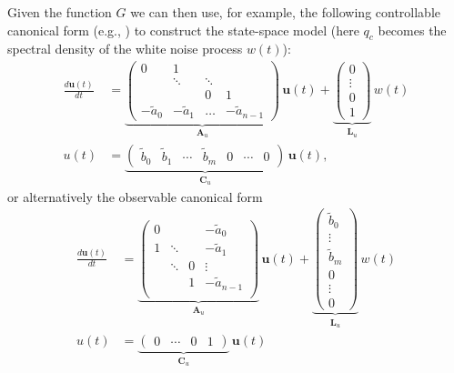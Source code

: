 \documentclass[journal]{IEEEtran}
\begin{document}
Given the function $G$ we can then use, for example, the following controllable canonical form (e.g., \cite{Glad+Ljung:2000}) to construct the state-space model (here $q_c$ becomes the spectral density of the white noise process $w(t)$):
%
\begin{equation}
\begin{split}
  \frac{d\mathbf{u}(t)}{dt}
  &= \underbrace{\begin{pmatrix}
       0             & 1      &        &       \\
                     & \ddots & \ddots &       \\
                     &         &  0    &     1 \\
   -\tilde{a}_0 & -\tilde{a}_1 & \hdots &  -\tilde{a}_{n-1}
  \end{pmatrix}}_{\mathbf{A}_u} \, \mathbf{u}(t) 
  + \underbrace{\begin{pmatrix}
      0 \\
      \vdots \\
      0 \\
      1
  \end{pmatrix}}_{\mathbf{L}_u} \,
   w(t) \\
   u(t) &=
   \underbrace{\begin{pmatrix} \tilde{b}_0 & \tilde{b}_1 & \cdots & \tilde{b}_m & 0 & \cdots & 0
   \end{pmatrix}}_{\mathbf{C}_u} \, \mathbf{u}(t),
\end{split}
\end{equation}
%
or alternatively the observable canonical form
%
\begin{equation}
\begin{split}
  \frac{d\mathbf{u}(t)}{dt}
  &= \underbrace{\begin{pmatrix}
       0             &        &        & -\tilde{a}_0 \\
       1             & \ddots &        & -\tilde{a}_1 \\
                     & \ddots &  0     & \vdots   \\
                     &        &  1     & -\tilde{a}_{n-1} \\
  \end{pmatrix}}_{\mathbf{A}_u} \, \mathbf{u}(t) 
  + \underbrace{\begin{pmatrix}
      \tilde{b}_0 \\
      \vdots \\
      \tilde{b}_m \\
      0 \\
      \vdots \\
      0
  \end{pmatrix}}_{\mathbf{L}_u} \,
   w(t) \\
   u(t) &=
   \underbrace{\begin{pmatrix} 0 & \cdots & 0 & 1 \end{pmatrix}}_{\mathbf{C}_u} \, \mathbf{u}(t)
\end{split}
\end{equation}
\end{document}
